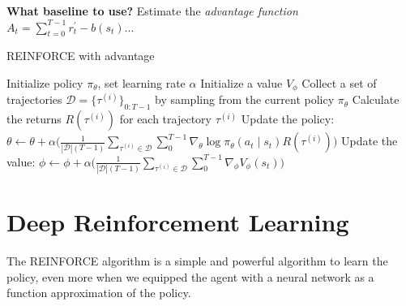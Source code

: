 \noindent \textbf{What baseline to use?} Estimate the \textit{advantage function} $A_{t} = \sum_{t=0}^{T-1} r_{t}^{'}-b(s_{t})$...

\begin{algorithm}
    \caption{REINFORCE with advantage }
    \begin{algorithmic}
    \STATE Initialize policy $\pi_{\theta}$, set learning rate $\alpha$
    \STATE Initialize a value $V_{\phi}$
        \STATE Collect a set of trajectories $\mathcal{D}=\{\tau^{(i)}\}_{0:T-1}$ by sampling from the current policy $\pi_{\theta}$
        \STATE Calculate the returns $R(\tau^{(i)})$ for each trajectory $\tau^{(i)}$
        \STATE Update the policy: $\theta \leftarrow \theta + \alpha \bigg(\frac{1}{|\mathcal{D}|(T-1)}\sum_{\tau^{(i)}\in\mathcal{D}}\sum_{0}^{T-1}\nabla_{\theta}\log\pi_{\theta}(a_{t}\mid s_{t})R(\tau^{(i)})\bigg)$
        \STATE Update the value: $\phi \leftarrow \phi + \alpha \bigg(\frac{1}{|\mathcal{D}|(T-1)}\sum_{\tau^{(i)}\in\mathcal{D}}\sum_{0}^{T-1}\nabla_{\phi}V_{\phi}(s_{t})\bigg)$
    \ENDFOR
    \end{algorithmic}
\end{algorithm}





\section{Deep Reinforcement Learning}

The REINFORCE algorithm is a simple and powerful algorithm to learn the policy,
even more when we equipped the agent with a neural network as a function 
approximation of the policy. 

